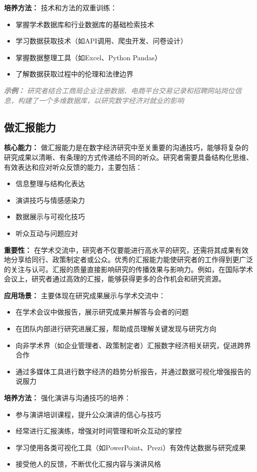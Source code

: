 \documentclass[lang=cn,12pt,a4paper]{elegantpaper}
\newcommand{\skillexample}[1]{\smallskip\noindent\textcolor{gray}{\textit{\footnotesize\textbf{示例：}} \textit{\footnotesize #1}}}
\begin{document}
{\textbf{培养方法：}} 技术和方法的双重训练：
\begin{itemize}
    \item 掌握学术数据库和行业数据库的基础检索技术
    \item 学习数据获取技术（如API调用、爬虫开发、问卷设计）
    \item 掌握数据整理工具（如Excel、Python Pandas）
    \item 了解数据获取过程中的伦理和法律边界
\end{itemize}

\skillexample{研究者结合工商局企业注册数据、电商平台交易记录和招聘网站岗位信息，构建了一个多维数据库，以研究数字经济对就业的影响}
\subsection{做汇报能力}
{\textbf{核心能力：}} 做汇报能力是在数字经济研究中至关重要的沟通技巧，能够将复杂的研究成果以清晰、有条理的方式传递给不同的听众。研究者需要具备结构化思维、有效表达和应对听众反馈的能力，主要包括：
\begin{itemize}
\item 信息整理与结构化表达
\item 演讲技巧与情感感染力
\item 数据展示与可视化技巧
\item 听众互动与问题应对
\end{itemize}

{\textbf{重要性：}} 在学术交流中，研究者不仅要能进行高水平的研究，还需将其成果有效地分享给同行、政策制定者或公众。优秀的汇报能力能使研究者的工作得到更广泛的关注与认可。汇报的质量直接影响研究的传播效果与影响力。例如，在国际学术会议上，研究者通过高效的汇报，能够获得更多的合作机会和研究资源。

{\textbf{应用场景：}} 主要体现在研究成果展示与学术交流中：
\begin{itemize}
\item 在学术会议中做报告，展示研究成果并解答与会者的问题
\item 在团队内部进行研究进展汇报，帮助成员理解关键发现与研究方向
\item 向非学术界（如企业管理者、政策制定者）汇报数字经济相关研究，促进跨界合作
\item 通过多媒体工具进行数字经济的趋势分析报告，并通过数据可视化增强报告的说服力
\end{itemize}

{\textbf{培养方法：}} 强化演讲与沟通技巧的培养：
\begin{itemize}
\item 参与演讲培训课程，提升公众演讲的信心与技巧
\item 经常进行汇报演练，增强对时间管理和听众互动的掌控
\item 学习使用各类可视化工具（如PowerPoint、Prezi）有效传达数据与研究成果
\item 接受他人的反馈，不断优化汇报内容与演讲风格
\end{itemize}
\end{document}

